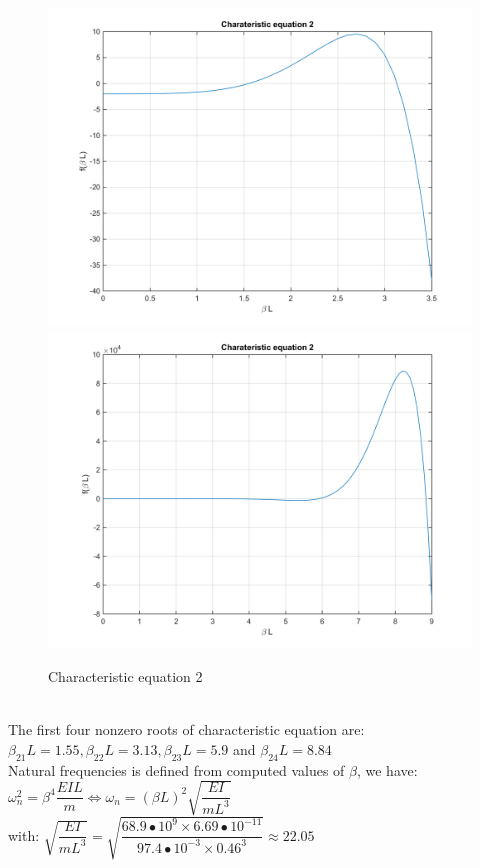 \documentclass[14pt,a4paper]{article}
\begin{document}
\begin{enumerate}
\begin{figure}[htp]
		\includegraphics[scale=0.4]{fn1_VB2_1.png}
		\includegraphics[scale=0.4]{fn1_VB2_2.png}
		\caption{Characteristic equation 2}
	\end{figure}\\
	The first four nonzero roots of characteristic equation are: $\beta_{21}L = 1.55, \beta_{22}L = 3.13, \beta_{23}L = 5.9 $ and $\beta_{24}L = 8.84$\\
	Natural frequencies is defined from computed values of $\beta$, we have: \\
	\hspace*{3cm} $\omega_n^2 = \beta^4\dfrac{EIL}{m} \Leftrightarrow \omega_n = (\beta L)^2\sqrt{\dfrac{EI}{mL^3}}$\\
	with: \hspace{1cm} 	$\sqrt{\dfrac{EI}{mL^3}} = \sqrt{\dfrac{68.9\bullet 10^9 \times 6.69\bullet 10^{-11}}{97.4\bullet10^{-3}\times 0.46^3}} \approx 22.05$\\

\end{enumerate}
\end{document}
